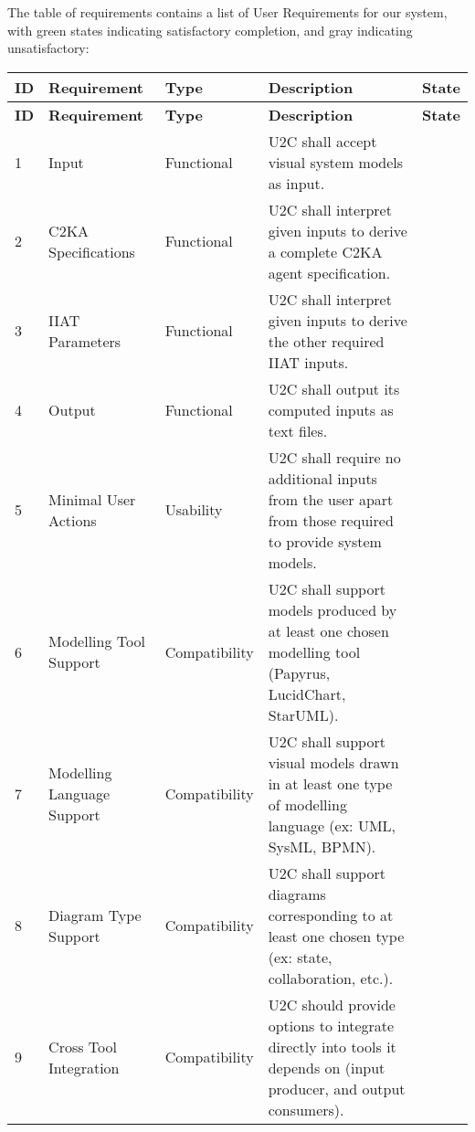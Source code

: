 \documentclass[11pt]{article}
\begin{document}
    The table of requirements contains a list of User Requirements for our system,
    with green states indicating satisfactory completion, and gray indicating unsatisfactory:
    \begin{longtable}{|l|p{2.6cm}|l|p{4.5cm}|c|}
        \hline
        \textbf{ID} & \textbf{Requirement} & \textbf{Type}  & \textbf{Description} & \textbf{State}\\
        \hline
        \endfirsthead
        \hline
        \textbf{ID} & \textbf{Requirement} & \textbf{Type}  & \textbf{Description} & \textbf{State}\\
        \hline
        \endhead
        \hline
        1 & Input & Functional & U2C shall accept visual system models as input. & \cellcolor{green!30}  \\
        \hline
        2 & C2KA Specifications & Functional & U2C shall interpret given inputs to derive a complete C2KA agent specification. & \cellcolor{green!30}  \\
        \hline
        3 & IIAT Parameters & Functional & U2C shall interpret given inputs to derive the other required IIAT inputs. & \cellcolor{gray!30}  \\
        \hline
        4 & Output & Functional & U2C shall output its computed inputs as text files. & \cellcolor{green!30}  \\
        \hline
        5 & Minimal User Actions & Usability & U2C shall require no additional inputs from the user apart from those required to provide system models. & \cellcolor{green!30}  \\
        \hline
        6 & Modelling Tool Support & Compatibility & U2C shall support models produced by at least one chosen modelling tool (Papyrus, LucidChart, StarUML). & \cellcolor{green!30}  \\
        \hline
        7 & Modelling Language Support & Compatibility & U2C shall support visual models drawn in at least one type of modelling language (ex: UML, SysML, BPMN). & \cellcolor{green!30}  \\
        \hline
        8 & Diagram Type Support & Compatibility & U2C shall support diagrams corresponding to at least one chosen type (ex: state, collaboration, etc.). & \cellcolor{green!30}  \\
        \hline
        9 & Cross Tool Integration & Compatibility & U2C should provide options to integrate directly into tools it depends on (input producer, and output consumers). & \cellcolor{gray!30}  \\

\end{longtable}
\end{document}
